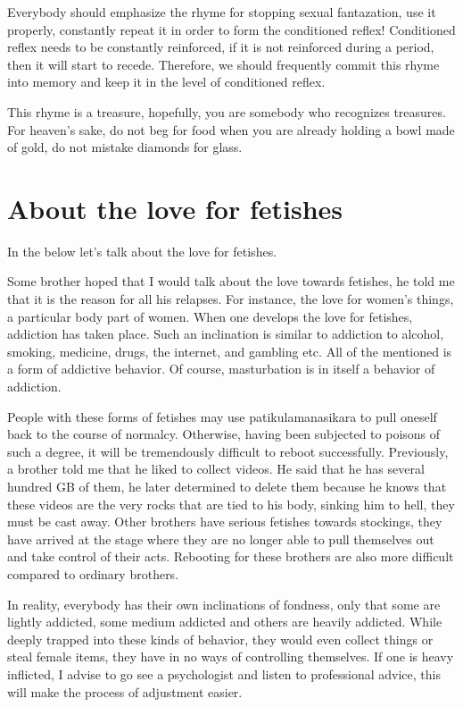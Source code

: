 \documentclass[
]{book}
\begin{document}
Everybody should emphasize the rhyme for stopping sexual fantazation, use it properly, constantly repeat it in order to form the conditioned reflex! Conditioned reflex needs to be constantly reinforced, if it is not reinforced during a period, then it will start to recede. Therefore, we should frequently commit this rhyme into memory and keep it in the level of conditioned reflex.

This rhyme is a treasure, hopefully, you are somebody who recognizes treasures. For heaven's sake, do not beg for food when you are already holding a bowl made of gold, do not mistake diamonds for glass.

\hypertarget{about-the-love-for-fetishes}{%
\section{About the love for fetishes}\label{about-the-love-for-fetishes}}

In the below let's talk about the love for fetishes.

Some brother hoped that I would talk about the love towards fetishes, he told me that it is the reason for all his relapses. For instance, the love for women's things, a particular body part of women. When one develops the love for fetishes, addiction has taken place. Such an inclination is similar to addiction to alcohol, smoking, medicine, drugs, the internet, and gambling etc. All of the mentioned is a form of addictive behavior. Of course, masturbation is in itself a behavior of addiction.

People with these forms of fetishes may use patikulamanasikara to pull oneself back to the course of normalcy. Otherwise, having been subjected to poisons of such a degree, it will be tremendously difficult to reboot successfully. Previously, a brother told me that he liked to collect videos. He said that he has several hundred GB of them, he later determined to delete them because he knows that these videos are the very rocks that are tied to his body, sinking him to hell, they must be cast away. Other brothers have serious fetishes towards stockings, they have arrived at the stage where they are no longer able to pull themselves out and take control of their acts. Rebooting for these brothers are also more difficult compared to ordinary brothers.

In reality, everybody has their own inclinations of fondness, only that some are lightly addicted, some medium addicted and others are heavily addicted. While deeply trapped into these kinds of behavior, they would even collect things or steal female items, they have in no ways of controlling themselves. If one is heavy inflicted, I advise to go see a psychologist and listen to professional advice, this will make the process of adjustment easier.
\end{document}
